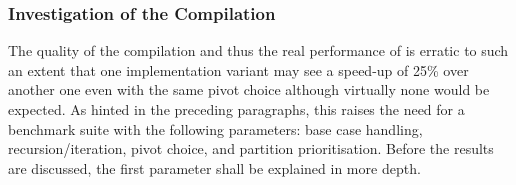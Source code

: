 \subsubsection*{Investigation of the Compilation}
\label{subsubsec:tasklet:quick:compilation}


The quality of the compilation and thus the real performance of \QS{} is erratic to such an extent that one implementation variant may see a speed-up of 25\% over another one even with the same pivot choice although virtually none would be expected.
As hinted in the preceding paragraphs, this raises the need for a benchmark suite with the following parameters:
base case handling, recursion/iteration, pivot choice, and partition prioritisation.
Before the results are discussed, the first parameter shall be explained in more depth.

